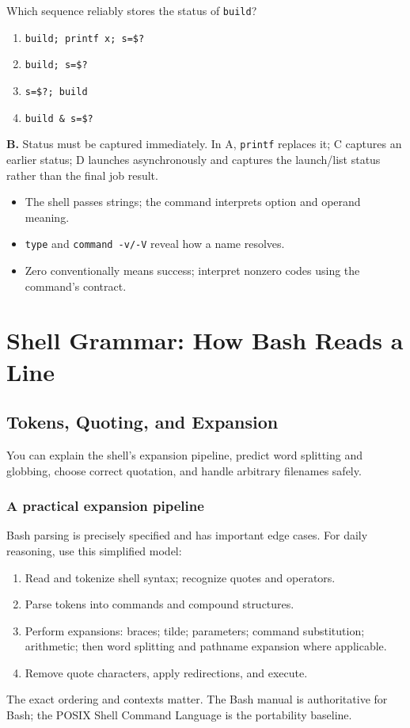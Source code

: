 \documentclass[11pt,oneside,openany]{book}
\newcommand{\fourchoices}[4]{%
  \begin{enumerate}[label=\Alph*),leftmargin=2em,itemsep=0.25em]
    \item #1
    \item #2
    \item #3
    \item #4
  \end{enumerate}}
\newcommand{\chaptergoals}[1]{%
  \begin{tcolorbox}[colback=Paper,colframe=Blue,title={Learning outcomes},fonttitle=\bfseries]
  #1
  \end{tcolorbox}}
\begin{document}
\begin{questionbox}[title={Hard 2.2 -- Status lifetime}]
Which sequence reliably stores the status of \texttt{build}?
\fourchoices{\texttt{build; printf x; s=\$?}}{\texttt{build; s=\$?}}{\texttt{s=\$?; build}}{\texttt{build \& s=\$?}}
\end{questionbox}
\begin{answerbox}
\textbf{B.} Status must be captured immediately. In A, \texttt{printf} replaces it; C captures an earlier status; D launches asynchronously and captures the launch/list status rather than the final job result.
\end{answerbox}

\begin{recapbox}
\begin{itemize}
  \item The shell passes strings; the command interprets option and operand meaning.
  \item \texttt{type} and \texttt{command -v/-V} reveal how a name resolves.
  \item Zero conventionally means success; interpret nonzero codes using the command's contract.
\end{itemize}
\end{recapbox}

\part{Shell Grammar: How Bash Reads a Line}

\chapter{Tokens, Quoting, and Expansion}
\chaptergoals{You can explain the shell's expansion pipeline, predict word splitting and globbing, choose correct quotation, and handle arbitrary filenames safely.}

\section{A practical expansion pipeline}
Bash parsing is precisely specified and has important edge cases. For daily reasoning, use this simplified model:
\begin{enumerate}
  \item Read and tokenize shell syntax; recognize quotes and operators.
  \item Parse tokens into commands and compound structures.
  \item Perform expansions: braces; tilde; parameters; command substitution; arithmetic; then word splitting and pathname expansion where applicable.
  \item Remove quote characters, apply redirections, and execute.
\end{enumerate}
The exact ordering and contexts matter. The Bash manual is authoritative for Bash; the POSIX Shell Command Language is the portability baseline.
\end{document}
